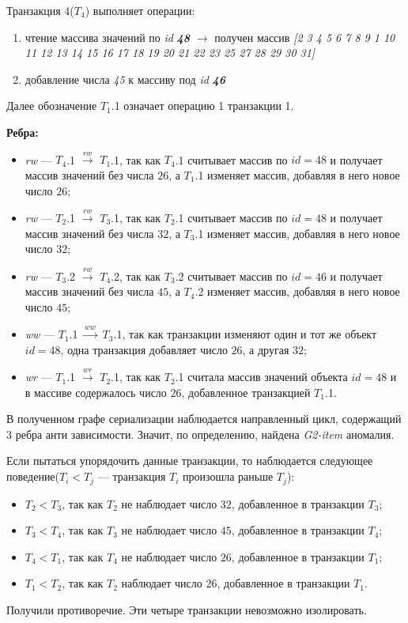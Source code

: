 \documentclass[14pt,  openany]{book}
\begin{document}
\par Транзакция 4(\textbf{$T_4$}) выполняет операции:
\begin{enumerate}
\item чтение массива значений по \textit{id} \textit{\textbf{48}} $\rightarrow$ получен массив \textit{[2 3 4 5 6 7 8 9 1 10 11 12 13 14 15 16 17 18 19 20 21 22 23 25 27 28 29 30 31]}
\item добавление числа \textit{45} к массиву под \textit{id} \textit{\textbf{46}}
\end{enumerate}

Далее обозначение \textbf{$T_1$}.1 означает операцию 1 транзакции 1.  

\par \textbf{Ребра:}
\begin{itemize}
\item \textit{rw} --- \textbf{$T_4$}.1 $ \xrightarrow{\textit{rw}}$  \textbf{$T_1$}.1,  так как \textbf{$T_4$}.1 считывает массив по $id=48$ и получает массив значений без числа $26$, а \textbf{$T_1$}.1 изменяет массив, добавляя в него новое число $26$;
\item \textit{rw} --- \textbf{$T_2$}.1 $ \xrightarrow{\textit{rw}}$  \textbf{$T_3$}.1,  так как \textbf{$T_2$}.1 считывает массив по $id=48$ и получает массив значений без числа $32$, а \textbf{$T_3$}.1 изменяет массив, добавляя в него новое число $32$;
\item \textit{rw} --- \textbf{$T_3$}.2 $ \xrightarrow{\textit{rw}}$  \textbf{$T_4$}.2,  так как \textbf{$T_3$}.2 считывает массив по $id=46$ и получает массив значений без числа $45$, а \textbf{$T_4$}.2 изменяет массив, добавляя в него новое число $45$;
\item \textit{ww} --- \textbf{$T_1$}.1 $ \xrightarrow{\textit{ww}}$  \textbf{$T_3$}.1, так как транзакции изменяют один и тот же объект $id=48$, одна транзакция добавляет число $26$, а другая $32$;
\item \textit{wr} --- \textbf{$T_1$}.1 $ \xrightarrow{\textit{wr}}$  \textbf{$T_2$}.1, так как \textbf{$T_2$}.1 считала массив значений объекта $id=48$ и в массиве содержалось число $26$, добавленное транзакцией \textbf{$T_1$}.1.
\end{itemize}
В полученном графе сериализации наблюдается направленный цикл, содержащий 3 ребра анти зависимости. Значит, по определению, найдена \textit{G2-item} аномалия.
\par Если пытаться упорядочить данные транзакции, то наблюдается следующее поведение($T_i<T_j$ --- транзакция $T_i$ произошла раньше $T_j$):
\begin{itemize}
\item $T_2 < T_3$, так как $T_2$ не наблюдает число $32$, добавленное в транзакции $T_3$; 
\item $T_3 < T_4$, так как $T_3$ не наблюдает число $45$, добавленное в транзакции $T_4$; 
\item $T_4 < T_1$, так как $T_4$ не наблюдает число $26$, добавленное в транзакции $T_1$;
\item $T_1 < T_2$, так как $T_2$ наблюдает число $26$, добавленное в транзакции $T_1$.  
\end{itemize}
Получили противоречие. Эти четыре транзакции невозможно изолировать.
\end{document}
